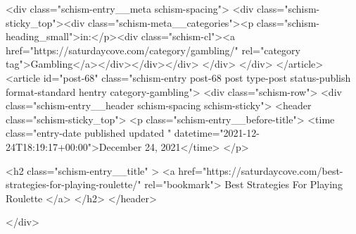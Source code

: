 {		<div class="schism-entry__meta schism-spacing">			<div class="schism-sticky_top"><div class="schism-meta__categories"><p class="schism-heading_small">in:</p><div class="schism-cl"><a href="https://saturdaycove.com/category/gambling/" rel="category tag">Gambling</a></div></div></div>		</div>
	</div>
</article>
<article id="post-68" class="schism-entry post-68 post type-post status-publish format-standard hentry category-gambling">
	<div class="schism-row">		<div class="schism-entry__header schism-spacing schism-sticky">			<header class="schism-sticky_top">				<p class="schism-entry__before-title">
					<time class="entry-date published updated " datetime="2021-12-24T18:19:17+00:00">December 24, 2021</time>				</p>

				<h2 class="schism-entry__title" >
					<a href="https://saturdaycove.com/best-strategies-for-playing-roulette/" rel="bookmark">
						Best Strategies For Playing Roulette					</a>
				</h2>
			</header>

					</div>

}
